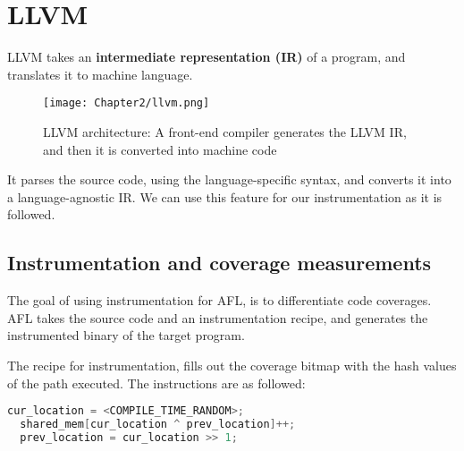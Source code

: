 \section{LLVM}

 \cite{llvm,lattner2004llvm} LLVM takes an \textbf{intermediate representation (IR)} of a program, and translates it to machine language.

\begin{figure}[htpb]
    \texttt{[image: Chapter2/llvm.png]}
    \centering
    \captionsetup{justification=centering}
    \caption{LLVM architecture: A front-end compiler generates the LLVM IR, and then it is converted into machine code \cite{omni_sci}}
    \label{fig:llvm}
\end{figure}

\cite{clang} It parses the source code, using the language-specific syntax, and converts it into a language-agnostic IR. We can use this feature for our instrumentation as it is followed.

\newpage

\subsection{Instrumentation and coverage measurements}
\label{instrumentation}

The goal of using instrumentation for AFL, is to differentiate code coverages. AFL takes the source code and an instrumentation recipe, and generates the instrumented binary of the target program.

The recipe for instrumentation, fills out the coverage bitmap with the hash values of the path executed. The instructions are as followed:

\begin{lstlisting}[language=C++,style=CodeStyle]
  cur_location = <COMPILE_TIME_RANDOM>;
  shared_mem[cur_location ^ prev_location]++; 
  prev_location = cur_location >> 1;
\end{lstlisting}

